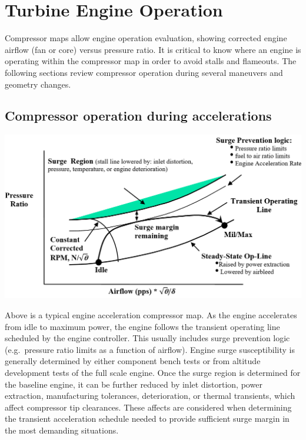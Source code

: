 \documentclass[
]{book}
\begin{document}
\hypertarget{turbine-engine-operation}{%
\section{Turbine Engine Operation}\label{turbine-engine-operation}}

Compressor maps allow engine operation evaluation, showing corrected engine
airflow (fan or core) versus pressure ratio. It is critical to know where an
engine is operating within the compressor map in order to avoid stalls and
flameouts. The following sections review compressor operation during several
maneuvers and geometry changes.

\hypertarget{compressor-operation-during-accelerations}{%
\subsection{Compressor operation during accelerations}\label{compressor-operation-during-accelerations}}

\includegraphics{media/17/eng-accel-compressor-map.png}

Above is a typical engine acceleration compressor map. As the engine accelerates
from idle to maximum power, the engine follows the transient operating line
scheduled by the engine controller. This usually includes surge prevention logic
(e.g.~pressure ratio limits as a function of airflow). Engine surge
susceptibility is generally determined by either component bench tests or from
altitude development tests of the full scale engine. Once the surge region is
determined for the baseline engine, it can be further reduced by inlet
distortion, power extraction, manufacturing tolerances, deterioration, or
thermal transients, which affect compressor tip clearances. These affects are
considered when determining the transient acceleration schedule needed to
provide sufficient surge margin in the most demanding situations.
\end{document}

